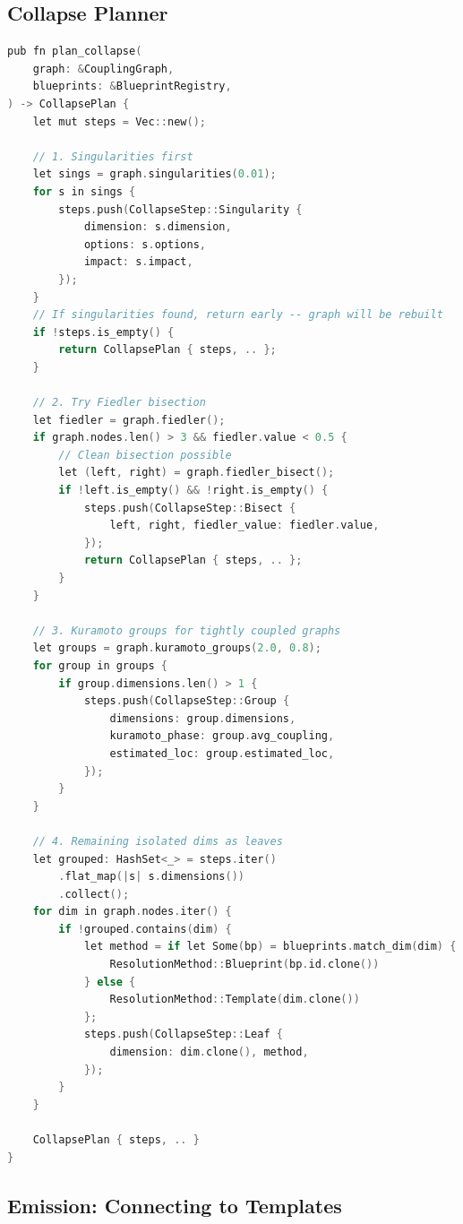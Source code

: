 \documentclass[11pt,a4paper]{article}
\begin{document}
\subsection{Collapse Planner}

\begin{lstlisting}[language=C]
pub fn plan_collapse(
    graph: &CouplingGraph,
    blueprints: &BlueprintRegistry,
) -> CollapsePlan {
    let mut steps = Vec::new();

    // 1. Singularities first
    let sings = graph.singularities(0.01);
    for s in sings {
        steps.push(CollapseStep::Singularity {
            dimension: s.dimension,
            options: s.options,
            impact: s.impact,
        });
    }
    // If singularities found, return early -- graph will be rebuilt
    if !steps.is_empty() {
        return CollapsePlan { steps, .. };
    }

    // 2. Try Fiedler bisection
    let fiedler = graph.fiedler();
    if graph.nodes.len() > 3 && fiedler.value < 0.5 {
        // Clean bisection possible
        let (left, right) = graph.fiedler_bisect();
        if !left.is_empty() && !right.is_empty() {
            steps.push(CollapseStep::Bisect {
                left, right, fiedler_value: fiedler.value,
            });
            return CollapsePlan { steps, .. };
        }
    }

    // 3. Kuramoto groups for tightly coupled graphs
    let groups = graph.kuramoto_groups(2.0, 0.8);
    for group in groups {
        if group.dimensions.len() > 1 {
            steps.push(CollapseStep::Group {
                dimensions: group.dimensions,
                kuramoto_phase: group.avg_coupling,
                estimated_loc: group.estimated_loc,
            });
        }
    }

    // 4. Remaining isolated dims as leaves
    let grouped: HashSet<_> = steps.iter()
        .flat_map(|s| s.dimensions())
        .collect();
    for dim in graph.nodes.iter() {
        if !grouped.contains(dim) {
            let method = if let Some(bp) = blueprints.match_dim(dim) {
                ResolutionMethod::Blueprint(bp.id.clone())
            } else {
                ResolutionMethod::Template(dim.clone())
            };
            steps.push(CollapseStep::Leaf {
                dimension: dim.clone(), method,
            });
        }
    }

    CollapsePlan { steps, .. }
}
\end{lstlisting}

\subsection{Emission: Connecting to Templates}
\end{document}

